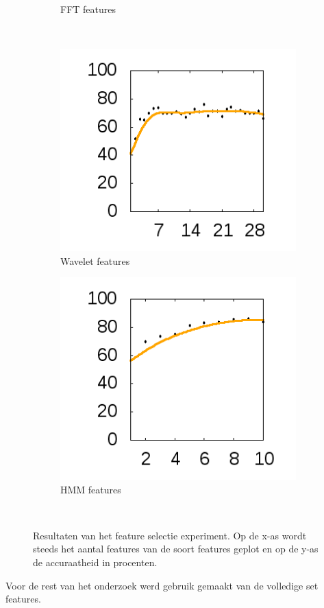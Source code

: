 \documentclass{article}
\begin{document}
\begin{figure}[htb]
\begin{subfigure}[b]{.49\linewidth}
    \caption{FFT features}\label{fig:1b}
  \end{subfigure} \\
  \begin{subfigure}[b]{.49\linewidth}
    \centering
    \includegraphics[width=.99\textwidth]{figures/DWTFeatures}
    \caption{Wavelet features}\label{fig:1c}
  \end{subfigure}
  \begin{subfigure}[b]{.49\linewidth}
    \centering
    \includegraphics[width=.99\textwidth]{figures/HMMFeatures}
    \caption{HMM features}\label{fig:1e}
  \end{subfigure} \\
  

  \caption{Resultaten van het feature selectie experiment. Op de x-as wordt steeds het aantal features van de soort features geplot en op de y-as de accuraatheid in procenten.}\label{fig:1}
\end{figure}
Voor de rest van het onderzoek werd gebruik gemaakt van de volledige set features.
\end{document}
